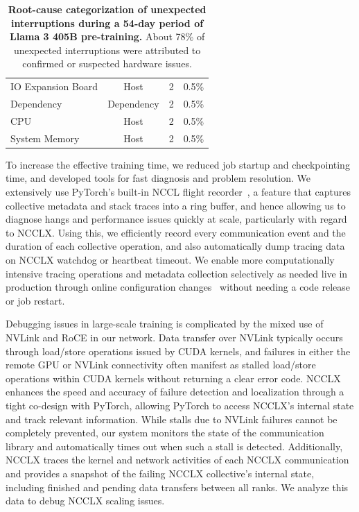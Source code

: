 \documentclass[dvipsnames]{fairmeta}
\begin{document}
\begin{table}[]
\begin{tabular}{lccc}
IO Expansion Board             & Host              & 2                           & 0.5\%                        \\
Dependency                     & Dependency        & 2                           & 0.5\%                        \\
CPU                            & Host              & 2                           & 0.5\%                        \\
System Memory                  & Host              & 2                           & 0.5\%    \\
\bottomrule
\end{tabular}
\caption{\textbf{Root-cause categorization of unexpected interruptions during a 54-day period of Llama 3 405B pre-training.} About 78\% of unexpected interruptions were attributed to confirmed or suspected hardware issues. }
\label{table:job_interruptions}
\end{table}

To increase the effective training time, we reduced job startup and checkpointing time, and developed tools for fast diagnosis and problem resolution. We extensively use PyTorch's built-in NCCL flight recorder~\citep{ansel2024pytorch}, a feature that captures collective metadata and stack traces into a ring buffer, and hence allowing us to diagnose hangs and performance issues quickly at scale, particularly with regard to NCCLX. Using this, we efficiently record every communication event and the duration of each collective operation, and also automatically dump tracing data on NCCLX watchdog or heartbeat timeout. We enable more computationally intensive tracing operations and metadata collection selectively as needed live in production through online configuration changes~\citep{configerator} without needing a code release or job restart.

Debugging issues in large-scale training is complicated by the mixed use of NVLink and RoCE in our network. Data transfer over NVLink typically occurs through load/store operations issued by CUDA kernels, and failures in either the remote GPU or NVLink connectivity often manifest as stalled load/store operations within CUDA kernels without returning a clear error code. NCCLX enhances the speed and accuracy of failure detection and localization through a tight co-design with PyTorch, allowing PyTorch to access NCCLX’s internal state and track relevant information. While stalls due to NVLink failures cannot be completely prevented, our system monitors the state of the communication library and automatically times out when such a stall is detected. Additionally, NCCLX traces the kernel and network activities of each NCCLX communication and provides a snapshot of the failing NCCLX collective's internal state, including finished and pending data transfers between all ranks. We analyze this data to debug NCCLX scaling issues.
\end{document}
